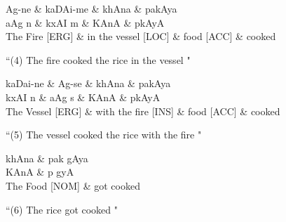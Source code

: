 \documentclass[twoside]{article}
\begin{document}
\hypertarget{fig4}{}
\begin{center}
\begin{dependency}[arc edge, arc angle=80, text only label, label style={above}]
   \begin{deptext}[column sep=1em]
      Ag-ne \&  kaDAi-me \& khAna \& pakAya \\
      {\dn aAg n\?} \&  {\dn kxAI m\?{\qva}} \& {\dn KAnA} \& {\dn pkAyA} \\      
      The Fire [ERG] \& in the vessel [LOC] \& food [ACC]  \& cooked \\
   \end{deptext}
\end{dependency} 

 ``(4) The fire cooked the rice in the vessel " 
 

\end{center}

\hypertarget{fig5}{}
\begin{center}
\begin{dependency}[arc edge, arc angle=80, text only label, label style={above}]
   \begin{deptext}[column sep=1em]
      kaDai-ne \&  Ag-se \& khAna \& pakAya \\
      {\dn kxAI n\?} \&  {\dn aAg s\?} \& {\dn KAnA} \& {\dn pkAyA} \\      
      The Vessel [ERG] \& with the fire [INS] \& food [ACC]  \& cooked \\
   \end{deptext}
\end{dependency} 

 ``(5) The vessel cooked the rice with the fire " 
 

\end{center}

\hypertarget{fig6}{}
\begin{center}
\begin{dependency}[arc edge, arc angle=80, text only label, label style={above}]
   \begin{deptext}[column sep=1em]
      khAna \& pak gAya \\
      {\dn KAnA} \& {\dn p gyA} \\      
      The Food [NOM] \& got cooked \\
   \end{deptext}
   
\end{dependency} 

 ``(6) The rice got cooked " 
 

\end{center}
\end{document}
